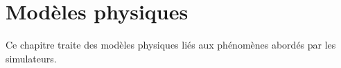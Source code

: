 \chapter{Modèles physiques}
%
Ce chapitre traite des modèles physiques liés aux phénomènes abordés par les simulateurs.
%




%
%
